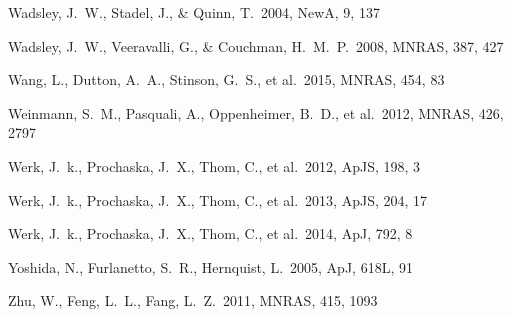 \documentclass[useAMS,usenatbib]{mn2e}
\def \apj {ApJ}
\def \mnras {MNRAS}
\def \apjs {ApJS}
\def \na {NewA}
\begin{document}
\begin{thebibliography}{}

 Wadsley, J.~W., Stadel, 
J., \& Quinn, T.\ 2004, \na, 9, 137 

 Wadsley, J.~W., 
Veeravalli, G., \& Couchman, H.~M.~P.\ 2008, \mnras, 387, 427 

 Wang, L., Dutton, A.~A.,  Stinson, G.~S., et al.\ 2015, \mnras, 454, 83

   Weinmann, S.~M., Pasquali, A., Oppenheimer, B.~D., et al.\ 2012, \mnras, 426, 2797 

 Werk, J.~k., Prochaska, J.~X., Thom, C., et al.\ 2012, \apjs, 198, 3

 Werk, J.~k., Prochaska, J.~X., Thom, C., et al.\ 2013, \apjs, 204, 17

 Werk, J.~k., Prochaska, J.~X., Thom, C., et al.\ 2014, \apj, 792, 8



Yoshida, N., Furlanetto, S.~R., Hernquist, L.\ 2005, \apj, 618L, 91


 Zhu, W., Feng, L.~L., Fang, L.~Z.\ 2011, \mnras, 415, 1093

\end{thebibliography}

\label{lastpage}
\end{document}
